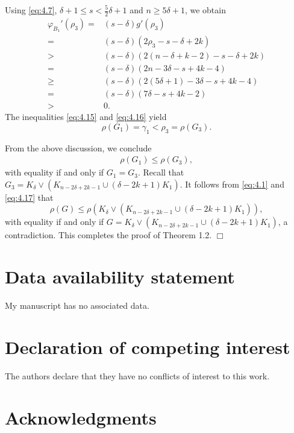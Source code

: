 \documentclass[10pt]{article}
\numberwithin{equation}{section}
\begin{document}
Using \eqref{eq:4.7}, $\delta+1\leq s<\frac{5}{2}\delta+1$ and $n\geq5\delta+1$, we obtain
\begin{align}\label{eq:4.16}
\varphi_{B_1}'(\rho_3)=&(s-\delta)g'(\rho_3)\nonumber\\
=&(s-\delta)(2\rho_3-s-\delta+2k)\nonumber\\
>&(s-\delta)(2(n-\delta+k-2)-s-\delta+2k)\nonumber\\
=&(s-\delta)(2n-3\delta-s+4k-4)\nonumber\\
\geq&(s-\delta)(2(5\delta+1)-3\delta-s+4k-4)\nonumber\\
=&(s-\delta)(7\delta-s+4k-2)\nonumber\\
>&0.
\end{align}
The inequalities \eqref{eq:4.15} and \eqref{eq:4.16} yield
$$
\rho(G_1)=\gamma_1<\rho_3=\rho(G_3).
$$

From the above discussion, we conclude
\begin{align}\label{eq:4.17}
\rho(G_1)\leq\rho(G_3),
\end{align}
with equality if and only if $G_1=G_3$. Recall that $G_3=K_{\delta}\vee(K_{n-2\delta+2k-1}\cup(\delta-2k+1)K_1)$. It follows from \eqref{eq:4.1}
and \eqref{eq:4.17} that
$$
\rho(G)\leq\rho(K_{\delta}\vee(K_{n-2\delta+2k-1}\cup(\delta-2k+1)K_1)),
$$
with equality if and only if $G=K_{\delta}\vee(K_{n-2\delta+2k-1}\cup(\delta-2k+1)K_1)$, a contradiction. This completes the proof of Theorem 1.2. \hfill $\Box$


\medskip

\section*{Data availability statement}

My manuscript has no associated data.


\section*{Declaration of competing interest}

The authors declare that they have no conflicts of interest to this work.


\section*{Acknowledgments}

\end{document}
